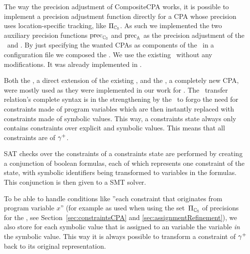 The way the precision adjustment of CompositeCPA works, it is possible to implement a precision adjustment function directly for a CPA whose precision uses location-specific tracking, like $\Pi_{\mathbb{C_{S}}}$.
As such we implemented the two auxiliary precision functions $\operatorname{\text{prec}}_{\mathbb{C_{S}}}$ and $\operatorname{\text{prec}}_{\mathbb{A}}$ as the precision adjustment of the \symbolicValueAnalysisCPA\ and \constraintsCPA.
By just specifying the wanted CPAs as components of the \compositeCPA\ in a configuration file we composed the \symbolicExecutionCPA.
We use the existing \locationCPA\ without any modifications. It was already implemented in \cpaChecker.

Both the \symbolicValueAnalysisCPA, a direct extension of the existing ,
and the \constraintsCPA, a completely new CPA, were mostly used as they were implemented in our work for \cite{Lemberger2015}.
The \constraintsCPA\ transfer relation's complete syntax is in the strengthening by the \symbolicValueAnalysisCPA\ to forgo the need for constraints made of program variables which are then instantly replaced with constraints made of symbolic values.
This way, a constraints state always only contains constraints over explicit and symbolic values. This means that all constraints are of ${\gamma^+}$.

SAT checks over the constraints of a constraints state are performed by creating a conjunction of boolean formulas, each of which represents one constraint of the state, with symbolic identifiers being transformed to variables in the formulas. This conjunction is then given to a SMT solver.

To be able to handle conditions like ''each constraint that originates from program variable $x$'' (for example as used when using the set~$\Pi_{\mathbb{C_{S}}}$ of precisions for the \constraintsCPA, see Section~\ref{sec:constraintsCPA} and \ref{sec:assignmentRefinement}),
we also store for each symbolic value that is assigned to an variable the variable \emph{in} the symbolic value.
This way it is always possible to transform a constraint of ${\gamma^+}$ back to its original representation.
